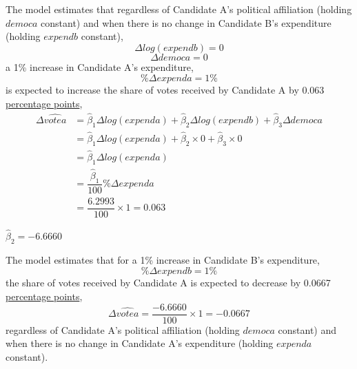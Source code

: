 \documentclass[12pt]{report}
\begin{document}
\noindent The model estimates that regardless of Candidate A’s political affiliation (holding $democa$ constant) and when there is no change in Candidate B’s expenditure (holding $expendb$ constant), $$\Delta log(expendb) = 0$$ $$\Delta democa = 0$$ a 1\% increase in Candidate A’s expenditure,
$$\%{\Delta}expenda = 1\%$$ is expected to increase the share of votes received by Candidate A  by 0.063 \uline{percentage points},
\begin{align*}
	\Delta \widehat{votea} &= \hat{\beta}_1\Delta log(expenda) + \hat{\beta}_2\Delta log(expendb) + \hat{\beta}_3\Delta democa \\
	&= \hat{\beta}_1\Delta log(expenda) + \hat{\beta}_2\times 0 + \hat{\beta}_3\times 0 \\
	&= \hat{\beta}_1\Delta log(expenda) \\
	&= \dfrac{\hat{\beta}_1}{100}\%{\Delta}expenda \\
	&= \dfrac{6.2993}{100}\times1=0.063
\end{align*}


\vspace{10mm}
\noindent $\hat{\beta}_2 = -6.6660$

\noindent The model estimates that for a 1\% increase in Candidate B’s expenditure,
$$\%{\Delta}expendb = 1\%$$
the share of votes received by Candidate A is expected to decrease by 0.0667 \uline{percentage points},
$${\Delta}\widehat{votea} = \dfrac{-6.6660}{100}\times1=-0.0667$$
regardless of Candidate A’s political affiliation (holding $democa$ constant) and when there is no change in Candidate A’s expenditure (holding $expenda$ constant).
\end{document}
